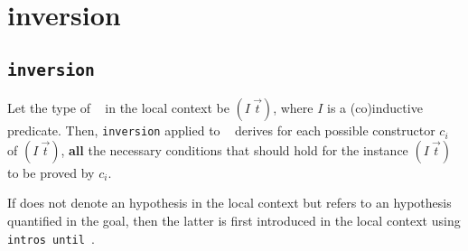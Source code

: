 \section{inversion}
\label{inversion}

\subsection{\tt inversion {\ident}}

Let the type of \ident~ in the local context be $(I~\vec{t})$,
where $I$ is a (co)inductive predicate. Then,
\texttt{inversion} applied to \ident~ derives for each possible
constructor $c_i$ of $(I~\vec{t})$, {\bf all} the necessary
conditions that should hold for the instance $(I~\vec{t})$ to be
proved by $c_i$.

\Rem If {\ident} does not denote an hypothesis in the local context
but refers to an hypothesis quantified in the goal, then the
latter is first introduced in the local context using
\texttt{intros until \ident}.

